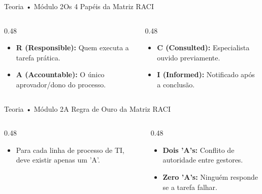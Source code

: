 \begin{senaiframe}{Teoria • Módulo 2}{Os 4 Papéis da Matriz RACI}
  \begin{columns}[t]
    \begin{column}{0.48\textwidth}
      \begin{tcolorbox}[senaibluecard, title={R \& A}]
        \begin{itemize}
          \item \textbf{R (Responsible):} Quem executa a tarefa prática.
          \item \textbf{A (Accountable):} O único aprovador/dono do processo.
        \end{itemize}
      \end{tcolorbox}
    \end{column}
    \begin{column}{0.48\textwidth}
      \begin{tcolorbox}[senaicard, title={C \& I}]
        \begin{itemize}
          \item \textbf{C (Consulted):} Especialista ouvido previamente.
          \item \textbf{I (Informed):} Notificado após a conclusão.
        \end{itemize}
      \end{tcolorbox}
    \end{column}
  \end{columns}
\end{senaiframe}

\begin{senaiframe}{Teoria • Módulo 2}{A Regra de Ouro da Matriz RACI}
  \begin{columns}[t]
    \begin{column}{0.48\textwidth}
      \begin{tcolorbox}[senairedcard, title={Exatamente UM 'A'}]
        \begin{itemize}
          \item Para cada linha de processo de TI, deve existir apenas um 'A'.
        \end{itemize}
      \end{tcolorbox}
    \end{column}
    \begin{column}{0.48\textwidth}
      \begin{tcolorbox}[senaiambercard, title={Erros Comuns}]
        \begin{itemize}
          \item \textbf{Dois 'A's:} Conflito de autoridade entre gestores.
          \item \textbf{Zero 'A's:} Ninguém responde se a tarefa falhar.
        \end{itemize}
      \end{tcolorbox}
    \end{column}
  \end{columns}
\end{senaiframe}

